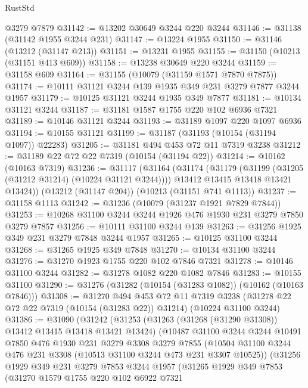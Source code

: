 \begin{lexlean}{RustStd}
\begin{coremodule}
    @3279
    @7879
@31142 := @13202 @30649 @3244 @220 @3244
@31146 := @31138 (@31142 @1955 @3244 @231)
@31147 := @13224 @1955
@31150 := @31146 (@13212 (@31147 @213))
@31151 := @13231 @1955
@31155 := @31150 (@10213 (@31151 @413 @609))
@31158 := @13238 @30649 @220 @3244
@31159 := @31158 @609
@31164 := @31155 (@10079 (@31159 @1571 @7870 @7875))
@31174 := @10111 @31121 @3244 @139 @1935 @349 @231 @3279 @7877 @3244 @1957
@31179 := @10125 @31121 @3244 @1935 @349 @7877
@31181 := @10134 @31121 @3244
@31187 := @31181 @1587 @1755 @220 @102 @6936 @7321
@31189 := @10146 @31121 @3244
@31193 := @31189 @1097 @220 @1097 @6936
@31194 := @10155 @31121
@31199 := @31187 (@31193 (@10154 (@31194 @1097)) @22283)
@31205 := @31181 @494 @453 @72 @11 @7319 @3238
@31212 := @31189 @22 @72 @22 @7319 (@10154 (@31194 @22))
@31214 := @10162 (@10163 @7319)
@31236 := @31117
    (@31164
      (@31174
        (@31179 (@31199 (@31205 (@31212 @31214) (@10224 @31121 @3244))))
        @13412
        @13415
        @13418
        @13421
        @13424))
    (@13212 (@31147 @204))
    (@10213 (@31151 @741 @1113))
@31237 := @31158 @1113
@31242 := @31236 (@10079 (@31237 @1921 @7829 @7844))
@31253 := @10268 @31100 @3244 @3244 @1926 @476 @1930 @231 @3279 @7850 @3279 @7857
@31256 := @10111 @31100 @3244 @139
@31263 := @31256 @1925 @349 @231 @3279 @7848 @3244 @1957
@31265 := @10125 @31100 @3244
@31268 := @31265 @1925 @349 @7848
@31270 := @10134 @31100 @3244
@31276 := @31270 @1923 @1755 @220 @102 @7846 @7321
@31278 := @10146 @31100 @3244
@31282 := @31278 @1082 @220 @1082 @7846
@31283 := @10155 @31100
@31290 := @31276 (@31282 (@10154 (@31283 @1082)) (@10162 (@10163 @7846)))
@31308 := @31270
    @494
    @453
    @72
    @11
    @7319
    @3238
    (@31278 @22 @72 @22 @7319 (@10154 (@31283 @22)) @31214)
    (@10224 @31100 @3244)
@31386 := @31090
    (@31242
      (@31253
        (@31263 (@31268 (@31290 @31308)) @13412 @13415 @13418 @13421 @13424)
        (@10487
          @31100
          @3244
          @3244
          @10491
          @7850
          @476
          @1930
          @231
          @3279
          @3308
          @3279
          @7855
          (@10504 @31100 @3244 @476 @231 @3308 (@10513 @31100 @3244 @473 @231 @3307 @10525))
          (@31256
            @1929
            @349
            @231
            @3279
            @7853
            @3244
            @1957
            (@31265
              @1929
              @349
              @7853
              (@31270
                @1579
                @1755
                @220
                @102
                @6922
                @7321

\end{coremodule}
\end{lexlean}
